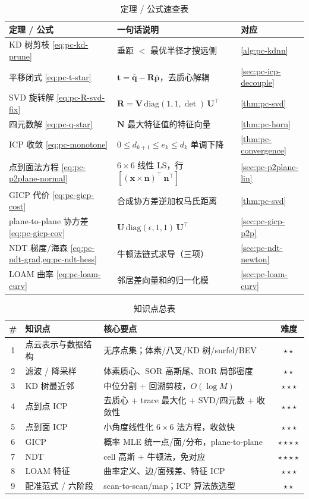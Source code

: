 \begin{table}[H]\centering\small
\caption{定理 / 公式速查表}
\begin{tabular}{lll}
\toprule
定理 / 公式 & 一句话说明 & 对应 \\
\midrule
KD 树剪枝 \cref{eq:pc-kd-prune} & 垂距 $<$ 最优半径才搜远侧 & \cref{alg:pc-kdnn} \\
平移闭式 \cref{eq:pc-t-star} & $\mathbf{t}=\bar{\mathbf{q}}-\mathbf{R}\bar{\mathbf{p}}$，去质心解耦 & \cref{sec:pc-icp-decouple} \\
SVD 旋转解 \cref{eq:pc-R-svd-fix} & $\mathbf{R}=\mathbf{V}\,\mathrm{diag}(1,1,\det)\,\mathbf{U}^\top$ & \cref{thm:pc-svd} \\
四元数解 \cref{eq:pc-q-star} & $\mathbf{N}$ 最大特征值的特征向量 & \cref{thm:pc-horn} \\
ICP 收敛 \cref{eq:pc-monotone} & $0\le d_{k+1}\le e_k\le d_k$ 单调下降 & \cref{thm:pc-convergence} \\
点到面法方程 \cref{eq:pc-p2plane-normal} & $6\times6$ 线性 LS，行 $[(\mathbf{x}\times\mathbf{n})^\top\ \mathbf{n}^\top]$ & \cref{sec:pc-p2plane-lin} \\
GICP 代价 \cref{eq:pc-gicp-cost} & 合成协方差逆加权马氏距离 & \cref{thm:pc-svd} \\
plane-to-plane 协方差 \cref{eq:pc-gicp-cov} & $\mathbf{U}\,\mathrm{diag}(\epsilon,1,1)\,\mathbf{U}^\top$ & \cref{sec:pc-gicp-p2p} \\
NDT 梯度/海森 \cref{eq:pc-ndt-grad,eq:pc-ndt-hess} & 牛顿法链式求导（三项） & \cref{sec:pc-ndt-newton} \\
LOAM 曲率 \cref{eq:pc-loam-curv} & 邻居差向量和的归一化模 & \cref{sec:pc-loam-curv} \\
\bottomrule
\end{tabular}
\end{table}

\begin{table}[H]\centering\small
\caption{知识点总表}
\begin{tabular}{cllc}
\toprule
\# & 知识点 & 核心要点 & 难度 \\
\midrule
1 & 点云表示与数据结构 & 无序点集；体素/八叉/KD 树/surfel/BEV & \(\star\star\) \\
2 & 滤波 / 降采样 & 体素质心、SOR 高斯尾、ROR 局部密度 & \(\star\star\) \\
3 & KD 树最近邻 & 中位分割 + 回溯剪枝，$O(\log M)$ & \(\star\star\star\) \\
4 & 点到点 ICP & 去质心 + trace 最大化 + SVD/四元数 + 收敛性 & \(\star\star\star\) \\
5 & 点到面 ICP & 小角度线性化 $6\times6$ 法方程，收敛快 & \(\star\star\star\) \\
6 & GICP & 概率 MLE 统一点/面/分布，plane-to-plane & \(\star\star\star\star\) \\
7 & NDT & cell 高斯 + 牛顿法，免对应 & \(\star\star\star\star\) \\
8 & LOAM 特征 & 曲率定义、边/面残差、特征 ICP & \(\star\star\star\) \\
9 & 配准范式 / 六阶段 & scan-to-scan/map；ICP 算法族选型 & \(\star\star\) \\
\bottomrule
\end{tabular}
\end{table}


